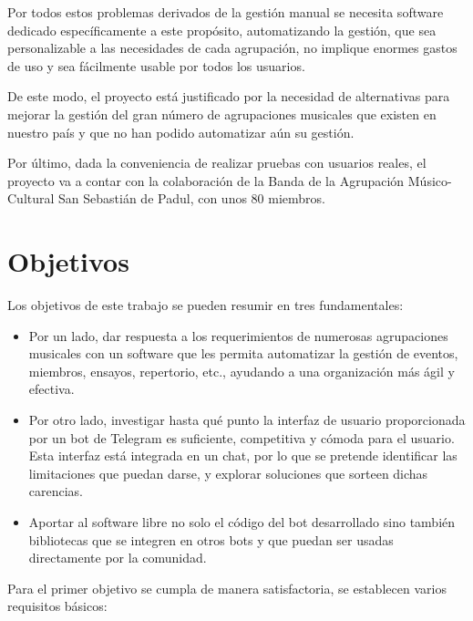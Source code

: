 Por todos estos problemas derivados de la gestión manual se necesita software dedicado específicamente a este propósito, automatizando la gestión, que sea personalizable a las necesidades de cada agrupación, no implique enormes gastos de uso y sea fácilmente usable por todos los usuarios.

De este modo, el proyecto está justificado por la necesidad de alternativas para mejorar la gestión del gran número de agrupaciones musicales que existen en nuestro país y que no han podido automatizar aún su gestión.

Por último, dada la conveniencia de realizar pruebas con usuarios reales, el proyecto va a contar con la colaboración de la Banda de la Agrupación Músico-Cultural San Sebastián de Padul, con unos 80 miembros.

\section{Objetivos}


Los objetivos de este trabajo se pueden resumir en tres fundamentales:

\begin{itemize}
    \item Por un lado, dar respuesta a los requerimientos de numerosas agrupaciones musicales con un software que les permita automatizar la gestión de eventos, miembros, ensayos, repertorio, etc., ayudando a una organización más ágil y efectiva.
    \item Por otro lado, investigar hasta qué punto la interfaz de usuario proporcionada por un bot de Telegram es suficiente, competitiva y cómoda para el usuario. Esta interfaz está integrada en un chat, por lo que se pretende identificar las limitaciones que puedan darse, y explorar soluciones que sorteen dichas carencias.
    \item Aportar al software libre no solo el código del bot desarrollado sino también bibliotecas que se integren en otros bots y que puedan ser usadas directamente por la comunidad.
\end{itemize}

Para el primer objetivo se cumpla de manera satisfactoria, se establecen varios requisitos básicos:

